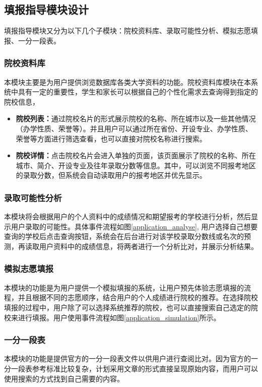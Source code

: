 \documentclass[a4paper,AutoFakeBold,oneside,12pt]{book}
\begin{document}
\subsection{填报指导模块设计}
填报指导模块又分为以下几个子模块：院校资料库、录取可能性分析、模拟志愿填报、一分一段表。
\subsubsection{院校资料库}
本模块主要是为用户提供浏览数据库各类大学资料的功能。院校资料库模块在本系统中具有一定的重要性，学生和家长可以根据自己的个性化需求去查询得到指定的院校信息，
\begin{itemize}
\item \textbf{院校列表：}通过院校名片的形式展示院校的名称、所在城市以及一些其他情况（办学性质、荣誉等）。并且用户可以通过所在省份、开设专业、办学性质、荣誉等方面进行筛选查看，也可以直接对院校名称进行搜索。
\item \textbf{院校详情：}点击院校名片会进入单独的页面，该页面展示了院校的名称、所在城市、简介、开设专业及往年录取分数等信息。其中，可以浏览不同报考地区的录取分数，但系统会自动读取用户的报考地区并优先显示。
\end{itemize}

\subsubsection{录取可能性分析}
本模块将会根据用户的个人资料中的成绩情况和期望报考的学校进行分析，然后显示用户录取的可能性。具体事件流程如图\ref{application_analyse}, 用户选择自己想要查询的学校后点击查询按钮，系统会在后台进行对该学校录取分数线或名次的预测，再读取用户资料中的成绩信息，将两者进行一个分析比对，并展示分析结果。

\subsubsection{模拟志愿填报}
本模块的功能是为用户提供一个模拟填报的系统，让用户预先体验志愿填报的流程，并且根据不同的志愿顺序，结合用户的个人成绩进行院校的推荐。在选择院校填报的过程中，用户除了可以选择系统推荐的院校，也可以直接搜索自己选定的院校来进行填报。用户使用事件流程如图\ref{application_simulation}所示。

\subsubsection{一分一段表}
本模块的功能是提供官方的一分一段表文件以供用户进行查阅比对。因为官方的一分一段表参考标准比较复杂，计划采用文章的形式直接呈现原始内容，而用户可以使用搜索的方式找到自己需要的内容。
\end{document}
